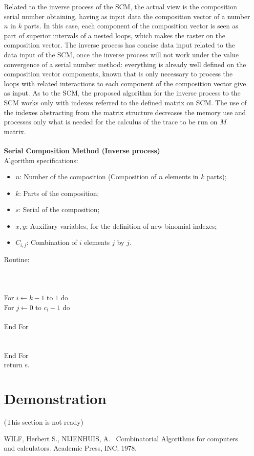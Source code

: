 \documentclass{amsart}
\begin{document}
Related to the inverse process of the SCM, the actual view is the composition serial number obtaining, having as input data the composition vector of a number {$n$} in {$k$} parts. In this case, each component of the composition vector is seen as part of superior intervals of a nested loops, which makes the raster on the composition vector. The inverse process has concise data input related to the data input of the SCM, once the inverse process will not work under the value convergence of a serial number method: everything is already well defined on the composition vector components, known that is only necessary to process the loops with related interactions to each component of the composition vector give as input.
As to the SCM, the proposed algorithm for the inverse process to the SCM works only with indexes referred to the defined matrix on SCM. The use of the indexes abstracting from the matrix structure decreases the memory use and processes only what is needed for the calculus of the trace to be run on {$M$} matrix.
\\\\
\textbf{Serial Composition Method (Inverse process)}
\\
    Algorithm specifications:
    \begin{itemize}
        \item {$n$}: Number of the composition (Composition of {$n$} elements in {$k$} parts);
        \item {$k$}: Parts of the composition;
        \item {$s$}: Serial of the composition;
        \item {$x,y$}: Auxiliary variables, for the definition of new binomial indexes;
        \item {$C_{i,j}$}: Combination of {$i$} elements {$j$} by {$j$}.
        \end{itemize}
        Routine:
        \\
         \\
         \\
         \\
        \indent For {$i \leftarrow k-1$} to {$1$} do \\
        \indent \indent For {$ j \leftarrow 0$} to {$c_i -1$} do \\
        \indent \indent {} \\
        \indent \indent End For \\
        \indent {} \\
        \indent {} \\
        \indent End For \\
        \indent return s. \\

\section*{Demonstration}
(This section is not ready)

\begin{thebibliography}{99}
 WILF, Herbert S., NIJENHUIS, A.
~Combinatorial Algorithms for computers and calculators. Academic
Press, INC, 1978.
\end{thebibliography}
\end{document}
